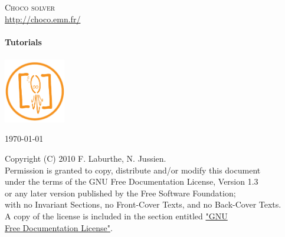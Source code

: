 \begin{titlepage}
\begin{center}
\textsc{\LARGE Choco solver}\\
\url{http://choco.emn.fr/}\\[1.5cm]

\HRule \\[0.4cm]
{ \Huge \bfseries Tutorials}\\
\HRule \\[1cm]
\includegraphics[width=0.20\textwidth]{../shared/media/logo.pdf} 

\vfill
{\large \today}
\end{center}
\end{titlepage}

\clearpage
{}
\begin{myquote}
Copyright (C)  2010  F. Laburthe, N. Jussien.\\
Permission is granted to copy, distribute and/or modify this document\\
under the terms of the GNU Free Documentation License, Version 1.3\\
or any later version published by the Free Software Foundation;\\
with no Invariant Sections, no Front-Cover Texts, and no Back-Cover Texts.\\
A copy of the license is included in the section entitled \hyperlink{licence}{"GNU \\Free Documentation License"}.
\end{myquote}
